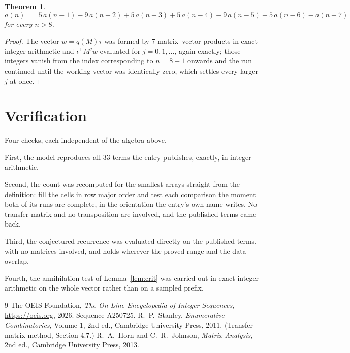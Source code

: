\documentclass[11pt,a4paper]{article}
\theoremstyle{plain}
\newtheorem{theorem}{Theorem}
\theoremstyle{definition}
\begin{document}
\begin{theorem}
\[
a(n)\;=\;5\,a(n-1) - 9\,a(n-2) + 5\,a(n-3) + 5\,a(n-4) - 9\,a(n-5) + 5\,a(n-6) - a(n-7)
\]
for every $n>8$.
\end{theorem}

\begin{proof}
The vector $w=q(M)\tau$ was formed by $7$ matrix--vector products in exact integer
arithmetic and $\iota^{\!\top}M^{j}w$ evaluated for $j=0,1,\dots$, again exactly; those
integers vanish from the index corresponding to $n=8+1$ onwards and the run continued
until the working vector was identically zero, which settles every larger $j$ at once.
\end{proof}

\section{Verification}

Four checks, each independent of the algebra above.

First, the model reproduces all $33$ terms the entry publishes, exactly, in integer
arithmetic.

Second, the count was recomputed for the smallest arrays straight from the definition: fill the
cells in row major order and test each comparison the moment both of its runs are complete,
in the orientation the entry's own name writes. No transfer matrix and no transposition are
involved, and the published terms came back.

Third, the conjectured recurrence was evaluated directly on the published terms, with no
matrices involved, and holds wherever the proved range and the data overlap.

Fourth, the annihilation test of Lemma~\ref{lem:crit} was carried out in exact integer
arithmetic on the whole vector rather than on a sampled prefix.

\begin{thebibliography}{9}
 The OEIS Foundation, \emph{The On-Line Encyclopedia of Integer
Sequences}, \url{https://oeis.org}, 2026. Sequence A250725.
 R.~P.~Stanley, \emph{Enumerative Combinatorics}, Volume 1, 2nd ed.,
Cambridge University Press, 2011. (Transfer-matrix method, Section 4.7.)
 R.~A.~Horn and C.~R.~Johnson, \emph{Matrix Analysis}, 2nd ed., Cambridge
University Press, 2013.
\end{thebibliography}
\end{document}
